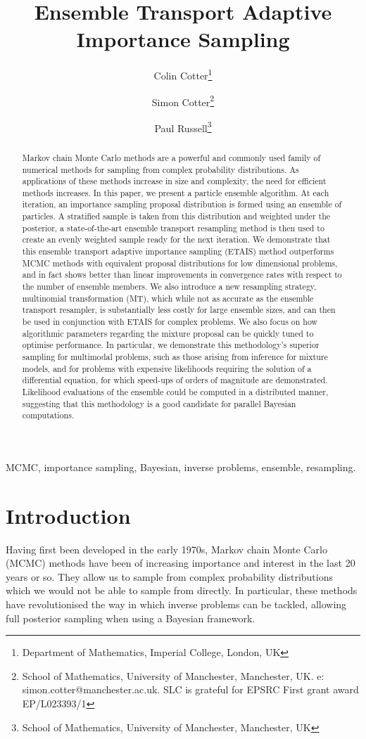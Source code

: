 \documentclass[final]{siamltex}
\author{Colin Cotter\thanks{Department of Mathematics, Imperial
    College, London, UK} \and Simon Cotter\thanks{School of
    Mathematics, University of Manchester, Manchester, UK. e:
    simon.cotter@manchester.ac.uk. SLC is grateful for EPSRC First
    grant award EP/L023393/1} \and Paul Russell\thanks{School of
    Mathematics, University of Manchester, Manchester, UK}}
\title{Ensemble Transport Adaptive Importance Sampling}
\newcommand{\revised}{}
\begin{document}
\maketitle
\begin{abstract}
Markov chain Monte Carlo methods are a powerful and commonly used
  family of numerical methods for sampling from complex probability
  distributions. {\revised As applications of these methods increase in size and
  complexity, the need for efficient methods increases. In this
paper, we present a particle ensemble algorithm.} At each iteration, an
  importance sampling proposal distribution is formed using an
  ensemble of particles. A stratified sample is taken from this
  distribution and weighted under the posterior, a state-of-the-art
  ensemble transport resampling method is then used to create an evenly weighted sample
  ready for the next iteration. We demonstrate that this ensemble transport
  adaptive importance sampling (ETAIS) method outperforms MCMC methods
  {\revised with equivalent proposal distributions} for low dimensional problems,
  and in fact shows
  better than linear improvements in convergence rates with respect to
  the number of ensemble members. We also introduce a new resampling
  strategy, {\revised multinomial transformation (MT),} which while not
  as accurate as the ensemble transport resampler, is substantially less costly for large
  ensemble sizes, and can then be used in conjunction with ETAIS for
  complex problems. We also focus on how algorithmic parameters
  regarding the mixture proposal can be quickly tuned to optimise
  performance. In particular, we demonstrate this methodology's
  superior sampling for multimodal problems, such as those arising
  from inference for mixture models, and for problems with expensive
  likelihoods requiring the solution of a differential equation, {\revised
    for
  which speed-ups of orders of magnitude are demonstrated. Likelihood
  evaluations of the ensemble could be computed in a distributed
  manner, suggesting that this methodology is a good candidate
  for parallel Bayesian computations.}
\end{abstract}
\begin{keywords}MCMC, importance sampling, Bayesian, inverse problems,
  {\revised ensemble, resampling}.
\end{keywords}
\section{Introduction}
Having first been developed in the early 1970s\cite{hastings1970monte}, Markov chain Monte Carlo (MCMC) methods have been of increasing
importance and interest in the last 20 years or so. They allow us to
sample from complex probability distributions which we would not be
able to sample from directly. In particular, these methods have
revolutionised the way in which inverse problems can be tackled,
allowing full posterior sampling when using a Bayesian framework. 
\end{document}
